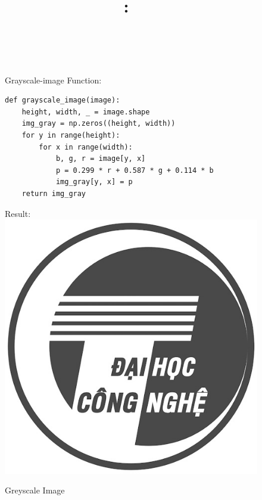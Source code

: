 \documentclass{article}
\title{
\vspace{-1in}
\textmd{\textbf{\hmwkClass:\ \hmwkTitle} \\ \hmwkAuthorName}\\
}
\author{}
\date{}
\begin{document}
\maketitle
\begin{figure}[htbp]
Grayscale-image Function:
    \begin{verbatim}
def grayscale_image(image):
    height, width, _ = image.shape
    img_gray = np.zeros((height, width))
    for y in range(height):
        for x in range(width):
            b, g, r = image[y, x]
            p = 0.299 * r + 0.587 * g + 0.114 * b
            img_gray[y, x] = p
    return img_gray
    \end{verbatim}
Result:
  \centering
  \includegraphics[width=\linewidth]{lena_gray.jpg}
  \caption{Greyscale Image}
  \label{fig:my_image}
\end{figure}
\end{document}
